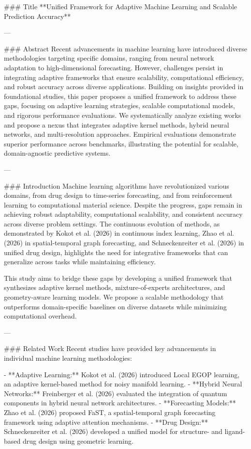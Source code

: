 ### Title  
**Unified Framework for Adaptive Machine Learning and Scalable Prediction Accuracy**

---

### Abstract  
Recent advancements in machine learning have introduced diverse methodologies targeting specific domains, ranging from neural network adaptation to high-dimensional forecasting. However, challenges persist in integrating adaptive frameworks that ensure scalability, computational efficiency, and robust accuracy across diverse applications. Building on insights provided in foundational studies, this paper proposes a unified framework to address these gaps, focusing on adaptive learning strategies, scalable computational models, and rigorous performance evaluations. We systematically analyze existing works and propose a nexus that integrates adaptive kernel methods, hybrid neural networks, and multi-resolution approaches. Empirical evaluations demonstrate superior performance across benchmarks, illustrating the potential for scalable, domain-agnostic predictive systems.  

---

### Introduction  
Machine learning algorithms have revolutionized various domains, from drug design to time-series forecasting, and from reinforcement learning to computational material science. Despite the progress, gaps remain in achieving robust adaptability, computational scalability, and consistent accuracy across diverse problem settings. The continuous evolution of methods, as demonstrated by Kokot et al. (2026) in continuous index learning, Zhao et al. (2026) in spatial-temporal graph forecasting, and Schneckenreiter et al. (2026) in unified drug design, highlights the need for integrative frameworks that can generalize across tasks while maintaining efficiency.  

This study aims to bridge these gaps by developing a unified framework that synthesizes adaptive kernel methods, mixture-of-experts architectures, and geometry-aware learning models. We propose a scalable methodology that outperforms domain-specific baselines on diverse datasets while minimizing computational overhead.  

---

### Related Work  
Recent studies have provided key advancements in individual machine learning methodologies:  

- **Adaptive Learning:** Kokot et al. (2026) introduced Local EGOP learning, an adaptive kernel-based method for noisy manifold learning.  
- **Hybrid Neural Networks:** Freinberger et al. (2026) evaluated the integration of quantum components in hybrid neural network architectures.  
- **Forecasting Models:** Zhao et al. (2026) proposed FaST, a spatial-temporal graph forecasting framework using adaptive attention mechanisms.  
- **Drug Design:** Schneckenreiter et al. (2026) developed a unified model for structure- and ligand-based drug design using geometric learning.  

